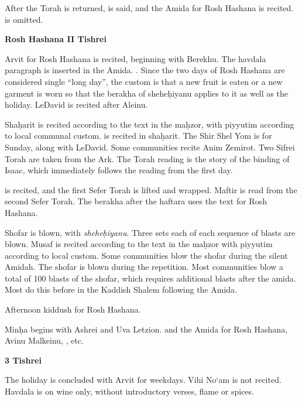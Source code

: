 {	\leinHaazinuweekday
	
	After the Torah is returned, \halfkad is said, and the Amida for Rosh Hashana is recited. \space is omitted.
	
	\textbf{Rosh Hashana II \textendash{} Tishrei}
	
	Arvit for Rosh Hashana is recited, beginning with Berekhu.  The havdala paragraph is inserted in the Amida.  \yakenhaz . Since the two days of Rosh Hashana are considered single ``long day'', the custom is that a new fruit is eaten or a new garment is worn so that the berakha of shehe\d{h}iyanu applies to it as well as the holiday. LeDavid is recited after Aleinu.
	
	Sha\d{h}arit is recited according to the text in the ma\d{h}zor, with piyyutim according to local communal custom.  is recited in sha\d{h}arit. The Shir Shel Yom is for Sunday, along with LeDavid.  Some communities recite Anim Zemirot.  Two Sifrei Torah are taken from the Ark.  The Torah reading is the story of the binding of Isaac, which immediately follows the reading from the first day.
	
	\leinRoshHashanaII
	
	\halfkad is recited, and the first Sefer Torah is lifted and wrapped. Maftir is read from the second Sefer Torah. \haftRoshHashanaII The berakha after the haftara uses the text for Rosh Hashana.
	
	Shofar is blown, with \textit{shehe\d{h}iyanu}. Three sets each of each sequence of blasts are blown.  Musaf is recited according to the text in the ma\d{h}zor with piyyutim according to local custom. Some communities blow the shofar during the silent Amidah.  The shofar is blown during the repetition.  Most communities blow a total of 100 blasts of the shofar, which requires additional blasts after the amida.  Most do this before  in the Kaddish Shalem following the Amida.
	
	Afternoon kiddush for Rosh Hashana.
	
	Min\d{h}a begins with Ashrei and Uva Letzion. \halfkad and the Amida for Rosh Hashana, Avinu Malkeinu, \fullkad , etc.
	
	\textbf{3 Tishrei}
	
	The holiday is concluded with Arvit for weekdays. Vihi No`am is not recited. Havdala is on wine only, without introductory verses, flame or spices.
}

